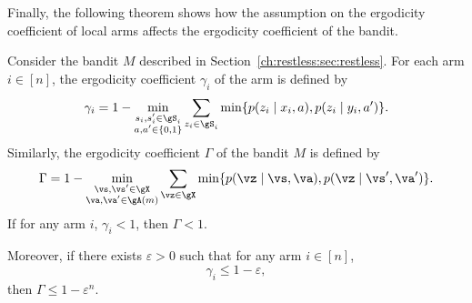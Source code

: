 Finally, the following theorem shows how the assumption on the ergodicity coefficient of local arms affects the ergodicity coefficient of the bandit.
\begin{thm}
    \label{thm:ergodicity_coeff}
    Consider the bandit $M$ described in Section~\ref{ch:restless:sec:restless}.
    For each arm $i\in[n]$, the ergodicity coefficient $\gamma_i$ of the arm is defined by
    \begin{align*}
        \gamma_i = 1-\min_{\substack{s_i,s'_i\in\gS_i \\a,a'\in\{0,1\}}} \sum_{z_i\in\gS_i} \min\{p(z_i \mid x_i, a), p(z_i \mid y_i, a')\}.
    \end{align*}
    Similarly, the ergodicity coefficient $\Gamma$ of the bandit $M$ is defined by
    \begin{align*}
        \Gamma = 1-\min_{\substack{\vs,\vs'\in\gX \\\va,\va'\in\gA(m)}} \sum_{\vz\in\gX} \min\{p(\vz \mid \vs, \va), p(\vz \mid \vs', \va')\}.
    \end{align*}
    If for any arm $i$, $\gamma_i<1$, then $\Gamma<1$.

    Moreover, if there exists $\varepsilon>0$ such that for any arm $i\in[n]$,
    \begin{equation}
        \label{eq:gamma_ep}
        \gamma_i \le 1-\varepsilon,
    \end{equation}
    then $\Gamma \le 1-\varepsilon^n$.
\end{thm}
